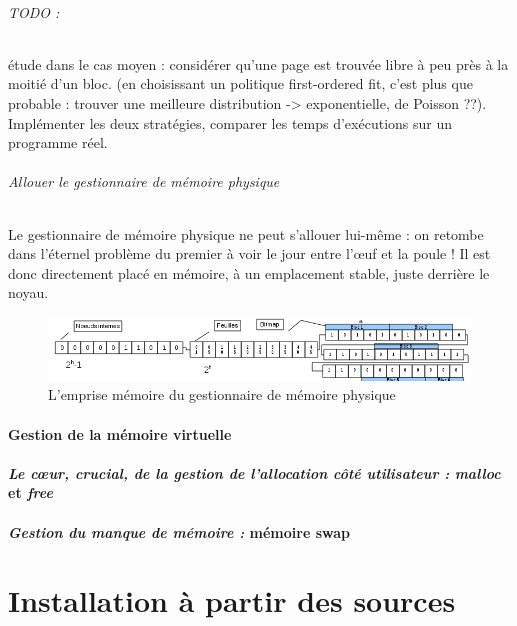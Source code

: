 \documentclass{article}
\begin{document}
\paragraph*{TODO :} étude dans le cas moyen : considérer qu'une page est trouvée libre à peu près à la moitié d'un bloc. (en choisissant un politique first-ordered fit, c'est plus que probable : trouver une meilleure distribution -> exponentielle, de Poisson ??). Implémenter les deux stratégies, comparer les temps d'exécutions sur un programme réel.\\

\paragraph*{Allouer le gestionnaire de mémoire physique}
  Le gestionnaire de mémoire physique ne peut s'allouer lui-même : on retombe dans l'éternel problème du premier à voir le jour entre l'œuf et la poule !
  Il est donc directement placé en mémoire, à un emplacement stable, juste derrière le noyau.
\begin{figure}[h]
\begin{center}
\includegraphics[scale=0.6]{AllocationPhysique-memoire.png}
\end{center}
\caption{L'emprise mémoire du gestionnaire de mémoire physique}
\label{L'emprise mémoire du gestionnaire de mémoire physique}
\end{figure}

\subsection{Gestion de la mémoire virtuelle}
\subsection{\textsl{Le cœur, crucial, de la gestion de l'allocation côté utilisateur :} \emph{malloc} et \emph{free}}
\subsection{\textsl{Gestion du manque de mémoire :} mémoire swap}


\part{Installation à partir des sources}
\end{document}
